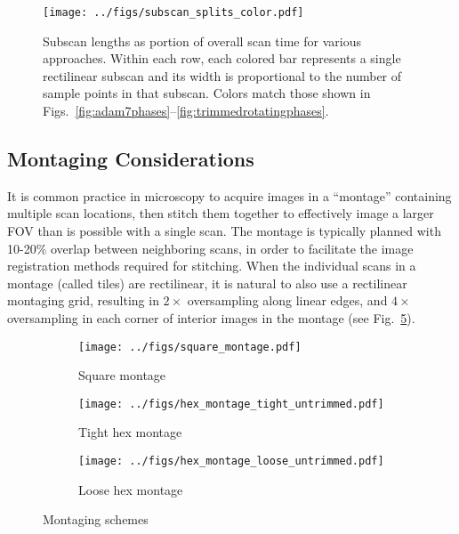 \documentclass{article}
\newcommand{\reffig}[1]{Fig.~\ref{fig:#1}}
\begin{document}
\begin{figure}
\centering
\texttt{[image: ../figs/subscan\_splits\_color.pdf]}
\caption{
\label{fig:subscanlengths} 
Subscan lengths as portion of overall scan time for various approaches.
%
Within each row, each colored bar represents a single rectilinear subscan and its width is proportional to the number of sample points in that subscan.
%
    Colors match those shown in
    Figs.~\ref{fig:adam7phases}--\ref{fig:trimmedrotatingphases}.
}
\end{figure}


\subsection{Montaging Considerations}
\label{sec:montaging}

It is common practice in microscopy to acquire images in a
``montage'' containing multiple scan locations, then stitch them together to
effectively image a larger FOV than is possible with a single scan.
%
The montage is typically planned with 10-20\% overlap between neighboring scans,
in order to facilitate the image registration methods required for stitching.
%
When the individual scans in a montage (called tiles) are rectilinear, it is
natural to also use a rectilinear montaging grid, resulting in $2\times$ oversampling
along linear edges, and $4\times$ oversampling in each corner of interior images in
the montage (see \reffig{montage}).
%

\begin{figure}[ht]
\centering
    \begin{subfigure}[b]{0.3\textwidth}
        \centering
        \texttt{[image: ../figs/square\_montage.pdf]}
        \caption{Square montage}
        \label{fig:square montage}
    \end{subfigure}
    \hfill
    \begin{subfigure}[b]{0.3\textwidth}
        \centering
        \texttt{[image: ../figs/hex\_montage\_tight\_untrimmed.pdf]}
        \caption{Tight hex montage}
        \label{fig:tight hex montage}
    \end{subfigure}
    \hfill
    \begin{subfigure}[b]{0.3\textwidth}
        \centering
        \texttt{[image: ../figs/hex\_montage\_loose\_untrimmed.pdf]}
        \caption{Loose hex montage}
        \label{fig:loose hex montage}
    \end{subfigure}
    \caption{Montaging schemes}
\label{fig:montage} 
\end{figure}
\end{document}
